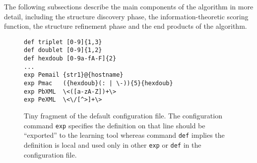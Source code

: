 The following subsections describe the main components of the algorithm
in more detail, including the structure discovery phase, the 
information-theoretic scoring function, the structure refinement phase
and the end products of the algorithm.

\begin{figure}
\begin{verbatim}
def triplet [0-9]{1,3}
def doublet [0-9]{1,2}
def hexdoub [0-9a-fA-F]{2}
...
exp Pemail {str1}@{hostname}
exp Pmac   ({hexdoub}(: | \-)){5}{hexdoub}
exp PbXML  \<([a-zA-Z])+\>
exp PeXML  \<\/[^>]+\>
\end{verbatim}
\caption{Tiny fragment of the default configuration file. 
The configuration command {\tt exp} specifies the definition on that
line should be  ``exported'' to
the learning tool whereas command {\tt def} implies the definition
is local and used only in other {\tt exp} or {\tt def} in the
configuration file.}
\label {fig:configfile}
\end{figure}







